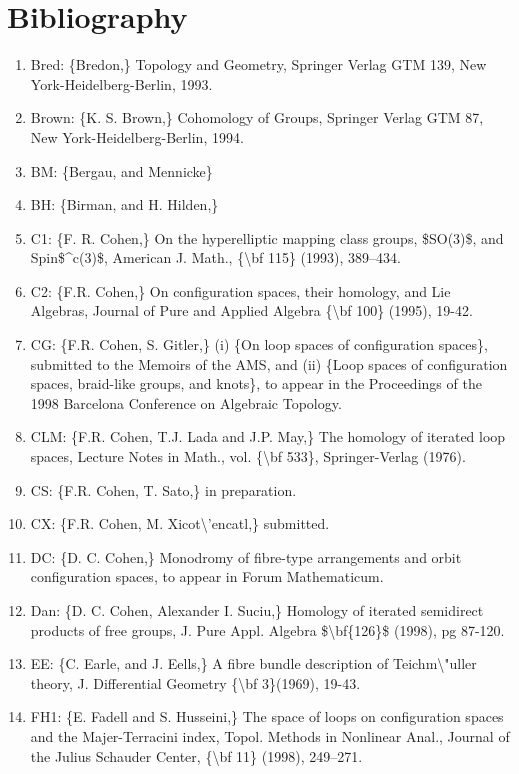 \documentclass[11pt]{article}
\begin{document}
\section*{Bibliography}
\begin{enumerate}[leftmargin=*]
  \item Bred: \{Bredon,\} Topology and Geometry, Springer Verlag GTM 139, New York-Heidelberg-Berlin, 1993.
  \item Brown: \{K. S. Brown,\} Cohomology of Groups, Springer Verlag GTM 87, New York-Heidelberg-Berlin, 1994.
  \item BM: \{Bergau, and Mennicke\}
  \item BH: \{Birman, and H. Hilden,\}
  \item C1: \{F. R. Cohen,\} On the hyperelliptic mapping class groups, \$SO(3)\$, and Spin\$\^{}c(3)\$, American J. Math., \{\textbackslash{}bf 115\} (1993), 389--434.
  \item C2: \{F.R. Cohen,\} On configuration spaces, their homology, and Lie Algebras, Journal of Pure and Applied Algebra \{\textbackslash{}bf 100\} (1995), 19-42.
  \item CG: \{F.R. Cohen, S. Gitler,\} (i) \{On loop spaces of configuration spaces\}, submitted to the Memoirs of the AMS, and (ii) \{Loop spaces of configuration spaces, braid-like groups, and knots\}, to appear in the Proceedings of the 1998 Barcelona Conference on Algebraic Topology.
  \item CLM: \{F.R. Cohen, T.J. Lada and J.P. May,\} The homology of iterated loop spaces, Lecture Notes in Math., vol. \{\textbackslash{}bf 533\}, Springer-Verlag (1976).
  \item CS: \{F.R. Cohen, T. Sato,\} in preparation.
  \item CX: \{F.R. Cohen, M. Xicot\textbackslash{}'encatl,\} submitted.
  \item DC: \{D. C. Cohen,\} Monodromy of fibre-type arrangements and orbit configuration spaces, to appear in Forum Mathematicum.
  \item Dan: \{D. C. Cohen, Alexander I. Suciu,\} Homology of iterated semidirect products of free groups, J. Pure Appl. Algebra \$\textbackslash{}bf\{126\}\$ (1998), pg 87-120.
  \item EE: \{C. Earle, and J. Eells,\} A fibre bundle description of Teichm\textbackslash{}"uller theory, J. Differential Geometry \{\textbackslash{}bf 3\}(1969), 19-43.
  \item FH1: \{E. Fadell and S. Husseini,\} The space of loops on configuration spaces and the Majer-Terracini index, Topol. Methods in Nonlinear Anal., Journal of the Julius Schauder Center, \{\textbackslash{}bf 11\} (1998), 249--271.

\end{enumerate}
\end{document}
